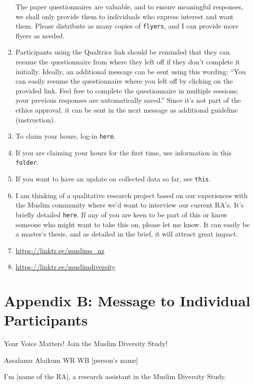 \documentclass[
]{interact}
\begin{document}
\begin{enumerate}
  The paper questionnaires are valuable, and to ensure meaningful
  responses, we shall only provide them to individuals who express
  interest and want them. Please distribute as many copies of
  \texttt{flyers}, and I can provide more flyers as needed.
\item
  Participants using the Qualtrics link should be reminded that they can
  resume the questionnaire from where they left off if they don't
  complete it initially. Ideally, an additional message can be sent
  using this wording: ``You can easily resume the questionnaire where
  you left off by clicking on the provided link. Feel free to complete
  the questionnaire in multiple sessions; your previous responses are
  automatically saved.'' Since it's not part of the ethics approval, it
  can be sent in the next message as additional guideline (instruction).
\item
  To claim your hours, log-in \texttt{here}.
\item
  If you are claiming your hours for the first time, use information in
  this \texttt{folder}.
\item
  If you want to have an update on collected data so far, see
  \texttt{this}.
\item
  I am thinking of a qualitative research project based on our
  experiences with the Muslim community where we'd want to interview our
  current RA's. It's briefly detailed \texttt{here}. If any of you are
  keen to be part of this or know someone who might want to take this
  on, please let me know. It can easily be a master's thesis, and as
  detailed in the brief, it will attract great impact.
\item
  \url{https://linktr.ee/muslims_nz}
\item
  \url{https://linktr.ee/muslimdiversity}
\end{enumerate}

\newpage{}

\section{Appendix B: Message to Individual
Participants}\label{appendix-b-message-to-individual-participants}

Your Voice Matters! Join the Muslim Diversity Study!

\noindent Assalamu Alaikum WR WB {[}person's name{]}

\noindent I'm {[}name of the RA{]}, a research assistant in the Muslim
Diversity Study.
\end{document}
